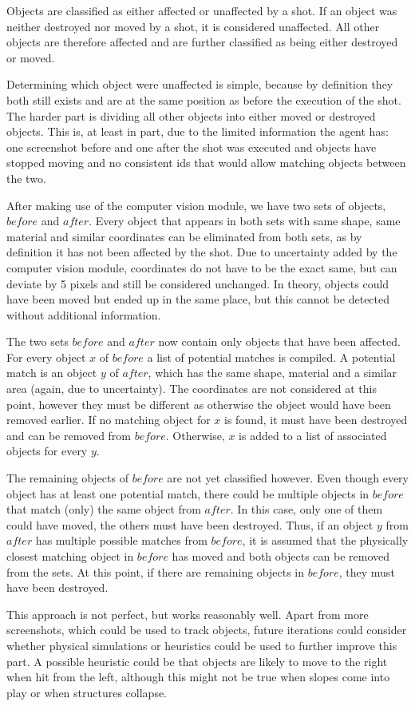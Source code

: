 Objects are classified as either affected or unaffected by a shot.
If an object was neither destroyed nor moved by a shot, it is considered unaffected.
All other objects are therefore affected and are further classified as being either destroyed or moved.

Determining which object were unaffected is simple, because by definition they both still exists and are at the same position as before the execution of the shot. The harder part is dividing all other objects into either moved or destroyed objects.
This is, at least in part, due to the limited information the agent has: one screenshot before and one after the shot was executed and objects have stopped moving and no consistent ids that would allow matching objects between the two.

After making use of the computer vision module, we have two sets of objects, $before$ and $after$. Every object that appears in both sets with same shape, same material and similar coordinates can be eliminated from both sets, as by definition it has not been affected by the shot.
Due to uncertainty added by the computer vision module, coordinates do not have to be the exact same, but can deviate by 5 pixels and still be considered unchanged. In theory, objects could have been moved but ended up in the same place, but this cannot be detected without additional information.

The two sets $before$ and $after$ now contain only objects that have been affected.
For every object $x$ of $before$ a list of potential matches is compiled. A potential match is an object $y$ of $after$, which has the same shape, material and a similar area (again, due to uncertainty). The coordinates are not considered at this point, however they must be different as otherwise the object would have been removed earlier.
If no matching object for $x$ is found, it must have been destroyed and can be removed from $before$. Otherwise, $x$ is added to a list of associated objects for every $y$.

The remaining objects of $before$ are not yet classified however. Even though every object has at least one potential match, there could be multiple objects in $before$ that match (only) the same object from $after$. In this case, only one of them could have moved, the others must have been destroyed. Thus, if an object $y$ from $after$ has multiple possible matches from $before$, it is assumed that the physically closest matching object in $before$ has moved and both objects can be removed from the sets. At this point, if there are remaining objects in $before$, they must have been destroyed.

This approach is not perfect, but works reasonably well. Apart from more screenshots, which could be used to track objects, future iterations could consider whether physical simulations or heuristics could be used to further improve this part. A possible heuristic could be that objects are likely to move to the right when hit from the left, although this might not be true when slopes come into play or when structures collapse.


